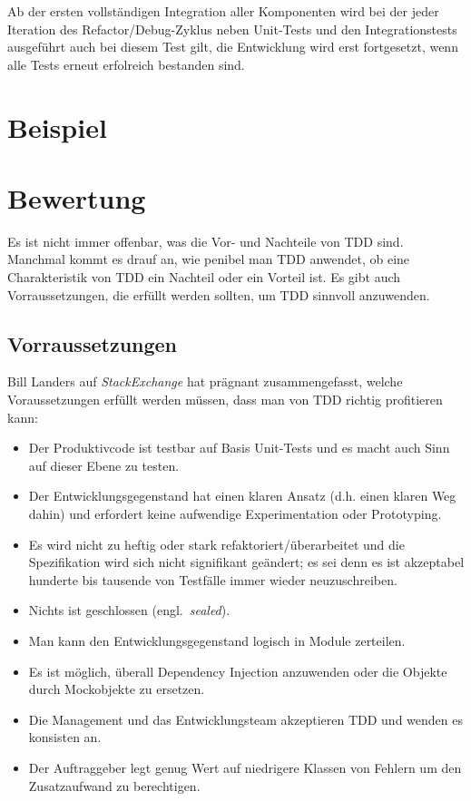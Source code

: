 \documentclass{mitschrift}
\newcommand{\pje}{\marginpar{Philipp\\Jeske}}
\newcommand{\bmn}{\marginpar{Benjamin\\Morgan}}
\begin{document}
Ab der ersten vollständigen Integration aller Komponenten wird bei der jeder
Iteration des Refactor/Debug-Zyklus neben Unit-Tests und den Integrationstests
ausgeführt auch bei diesem Test gilt, die Entwicklung wird erst fortgesetzt,
wenn alle Tests erneut erfolreich bestanden sind.

\chapter{Beispiel}\label{Beispiel}\pje

\chapter{Bewertung}\label{Bewertung}\bmn

Es ist nicht immer offenbar, was die Vor- und Nachteile von TDD sind. Manchmal
kommt es drauf an, wie penibel man TDD anwendet, ob eine Charakteristik von TDD
ein Nachteil oder ein Vorteil ist. Es gibt auch Vorraussetzungen, die erfüllt
werden sollten, um TDD sinnvoll anzuwenden.

\section{Vorraussetzungen}\label{Vorraussetzungen}
Bill Landers auf \emph{StackExchange} \cite{StackExchange} hat prägnant
zusammengefasst, welche Voraussetzungen erfüllt werden müssen, dass man von TDD
richtig profitieren kann:

\begin{itemize}
    \item Der Produktivcode ist testbar auf Basis Unit-Tests und es macht auch
        Sinn auf dieser Ebene zu testen.
    \item Der Entwicklungsgegenstand hat einen klaren Ansatz (d.h. einen klaren
        Weg dahin) und erfordert keine aufwendige Experimentation oder
        Prototyping.
    \item Es wird nicht zu heftig oder stark refaktoriert/überarbeitet und
        die Spezifikation wird sich nicht signifikant geändert; es sei denn es
        ist akzeptabel hunderte bis tausende von Testfälle immer wieder
        neuzuschreiben.
    \item Nichts ist geschlossen (engl.\ \emph{sealed}).
    \item Man kann den Entwicklungsgegenstand logisch in Module zerteilen.
    \item Es ist möglich, überall Dependency Injection anzuwenden oder die
        Objekte durch Mockobjekte zu ersetzen.
    \item Die Management und das Entwicklungsteam akzeptieren TDD und wenden es
        konsisten an.
    \item Der Auftraggeber legt genug Wert auf niedrigere Klassen von Fehlern
        um den Zusatzaufwand zu berechtigen.
\end{itemize}
\end{document}
